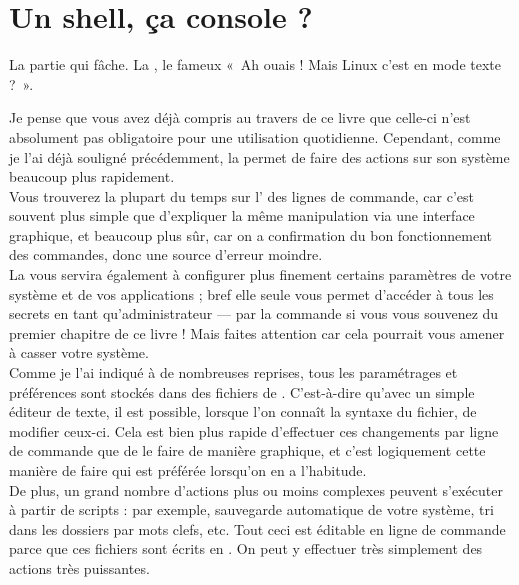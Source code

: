 \section{Un shell, ça console ?}
La partie qui fâche. La , le fameux «~Ah ouais ! Mais Linux c'est en mode texte ?~».\par
Je pense que vous avez déjà compris au travers de ce livre que celle-ci n'est absolument pas obligatoire pour une utilisation quotidienne. Cependant, comme je l'ai déjà souligné précédemment, la  permet de faire des actions sur son système beaucoup plus rapidement.\\
Vous trouverez la plupart du temps sur l' des lignes de commande, car c'est souvent plus simple que d'expliquer la même manipulation via une interface graphique, et beaucoup plus sûr, car on a confirmation du bon fonctionnement des commandes, donc une source d'erreur moindre.\\
La  vous servira également à configurer plus finement certains paramètres de votre système et de vos applications ; bref elle seule vous permet d'accéder à tous les secrets en tant qu'administrateur --- par la commande  si vous vous souvenez du premier chapitre de ce livre ! Mais faites attention car cela pourrait vous amener à casser votre système.\\
Comme je l'ai indiqué à de nombreuses reprises, tous les paramétrages et préférences sont stockés dans des fichiers de . C'est-à-dire qu'avec un simple éditeur de texte, il est possible, lorsque l'on connaît la syntaxe du fichier, de modifier ceux-ci. Cela est bien plus rapide d'effectuer ces changements par ligne de commande que de le faire de manière graphique, et c'est logiquement cette manière de faire qui est préférée lorsqu'on en a l'habitude.\\
De plus, un grand nombre d'actions plus ou moins complexes peuvent s'exécuter à partir de scripts : par exemple, sauvegarde automatique de votre système, tri dans les dossiers par mots clefs, etc. Tout ceci est éditable en ligne de commande parce que ces fichiers sont écrits en . On peut y effectuer très simplement des actions très puissantes.\par
